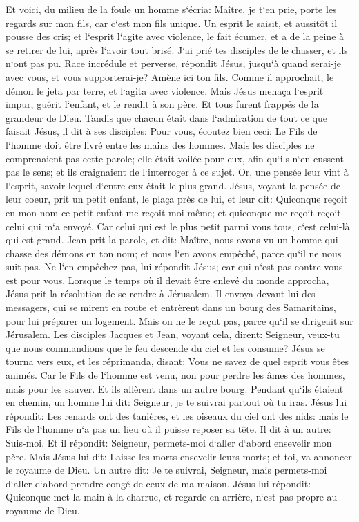 \verse Et voici, du milieu de la foule un homme s`écria: Maître, je t`en prie, porte les regards sur mon fils, car c`est mon fils unique. 
\verse Un esprit le saisit, et aussitôt il pousse des cris; et l`esprit l`agite avec violence, le fait écumer, et a de la peine à se retirer de lui, après l`avoir tout brisé. 
\verse J`ai prié tes disciples de le chasser, et ils n`ont pas pu. 
\verse Race incrédule et perverse, répondit Jésus, jusqu`à quand serai-je avec vous, et vous supporterai-je? Amène ici ton fils. 
\verse Comme il approchait, le démon le jeta par terre, et l`agita avec violence. Mais Jésus menaça l`esprit impur, guérit l`enfant, et le rendit à son père. 
\verse Et tous furent frappés de la grandeur de Dieu. Tandis que chacun était dans l`admiration de tout ce que faisait Jésus, il dit à ses disciples: 
\verse Pour vous, écoutez bien ceci: Le Fils de l`homme doit être livré entre les mains des hommes. 
\verse Mais les disciples ne comprenaient pas cette parole; elle était voilée pour eux, afin qu`ils n`en eussent pas le sens; et ils craignaient de l`interroger à ce sujet. 
\verse Or, une pensée leur vint à l`esprit, savoir lequel d`entre eux était le plus grand. 
\verse Jésus, voyant la pensée de leur coeur, prit un petit enfant, le plaça près de lui, 
\verse et leur dit: Quiconque reçoit en mon nom ce petit enfant me reçoit moi-même; et quiconque me reçoit reçoit celui qui m`a envoyé. Car celui qui est le plus petit parmi vous tous, c`est celui-là qui est grand. 
\verse Jean prit la parole, et dit: Maître, nous avons vu un homme qui chasse des démons en ton nom; et nous l`en avons empêché, parce qu`il ne nous suit pas. 
\verse Ne l`en empêchez pas, lui répondit Jésus; car qui n`est pas contre vous est pour vous. 
\verse Lorsque le temps où il devait être enlevé du monde approcha, Jésus prit la résolution de se rendre à Jérusalem. 
\verse Il envoya devant lui des messagers, qui se mirent en route et entrèrent dans un bourg des Samaritains, pour lui préparer un logement. 
\verse Mais on ne le reçut pas, parce qu`il se dirigeait sur Jérusalem. 
\verse Les disciples Jacques et Jean, voyant cela, dirent: Seigneur, veux-tu que nous commandions que le feu descende du ciel et les consume? 
\verse Jésus se tourna vers eux, et les réprimanda, disant: Vous ne savez de quel esprit vous êtes animés. 
\verse Car le Fils de l`homme est venu, non pour perdre les âmes des hommes, mais pour les sauver. Et ils allèrent dans un autre bourg. 
\verse Pendant qu`ils étaient en chemin, un homme lui dit: Seigneur, je te suivrai partout où tu iras. 
\verse Jésus lui répondit: Les renards ont des tanières, et les oiseaux du ciel ont des nids: mais le Fils de l`homme n`a pas un lieu où il puisse reposer sa tête. 
\verse Il dit à un autre: Suis-moi. Et il répondit: Seigneur, permets-moi d`aller d`abord ensevelir mon père. 
\verse Mais Jésus lui dit: Laisse les morts ensevelir leurs morts; et toi, va annoncer le royaume de Dieu. 
\verse Un autre dit: Je te suivrai, Seigneur, mais permets-moi d`aller d`abord prendre congé de ceux de ma maison. 
\verse Jésus lui répondit: Quiconque met la main à la charrue, et regarde en arrière, n`est pas propre au royaume de Dieu. 

